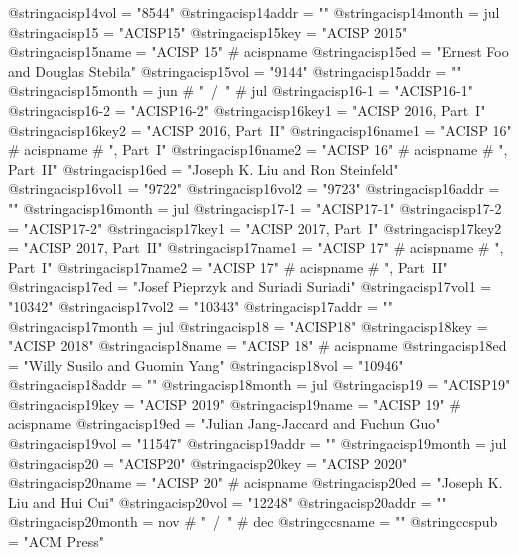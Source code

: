 @string{acisp14vol =            "8544"}
@string{acisp14addr =           ""}
@string{acisp14month =          jul}
@string{acisp15 =               "ACISP15"}
@string{acisp15key =            "ACISP 2015"}
@string{acisp15name =           "ACISP 15" # acispname}
@string{acisp15ed =             "Ernest Foo and Douglas Stebila"}
@string{acisp15vol =            "9144"}
@string{acisp15addr =           ""}
@string{acisp15month =          jun # "~/~" # jul}
@string{acisp16-1 =             "ACISP16-1"}
@string{acisp16-2 =             "ACISP16-2"}
@string{acisp16key1 =           "ACISP 2016, Part~I"}
@string{acisp16key2 =           "ACISP 2016, Part~II"}
@string{acisp16name1 =          "ACISP 16" # acispname # ", Part~I"}
@string{acisp16name2 =          "ACISP 16" # acispname # ", Part~II"}
@string{acisp16ed =             "Joseph K. Liu and Ron Steinfeld"}
@string{acisp16vol1 =           "9722"}
@string{acisp16vol2 =           "9723"}
@string{acisp16addr =           ""}
@string{acisp16month =          jul}
@string{acisp17-1 =             "ACISP17-1"}
@string{acisp17-2 =             "ACISP17-2"}
@string{acisp17key1 =           "ACISP 2017, Part~I"}
@string{acisp17key2 =           "ACISP 2017, Part~II"}
@string{acisp17name1 =          "ACISP 17" # acispname # ", Part~I"}
@string{acisp17name2 =          "ACISP 17" # acispname # ", Part~II"}
@string{acisp17ed =             "Josef Pieprzyk and Suriadi Suriadi"}
@string{acisp17vol1 =           "10342"}
@string{acisp17vol2 =           "10343"}
@string{acisp17addr =           ""}
@string{acisp17month =          jul}
@string{acisp18 =               "ACISP18"}
@string{acisp18key =            "ACISP 2018"}
@string{acisp18name =           "ACISP 18" # acispname}
@string{acisp18ed =             "Willy Susilo and Guomin Yang"}
@string{acisp18vol =            "10946"}
@string{acisp18addr =           ""}
@string{acisp18month =          jul}
@string{acisp19 =               "ACISP19"}
@string{acisp19key =            "ACISP 2019"}
@string{acisp19name =           "ACISP 19" # acispname}
@string{acisp19ed =             "Julian Jang-Jaccard and Fuchun Guo"}
@string{acisp19vol =            "11547"}
@string{acisp19addr =           ""}
@string{acisp19month =          jul}
@string{acisp20 =               "ACISP20"}
@string{acisp20key =            "ACISP 2020"}
@string{acisp20name =           "ACISP 20" # acispname}
@string{acisp20ed =             "Joseph K. Liu and Hui Cui"}
@string{acisp20vol =            "12248"}
@string{acisp20addr =           ""}
@string{acisp20month =          nov # "~/~" # dec}
@string{ccsname =               ""}
@string{ccspub =                "{ACM} Press"}
